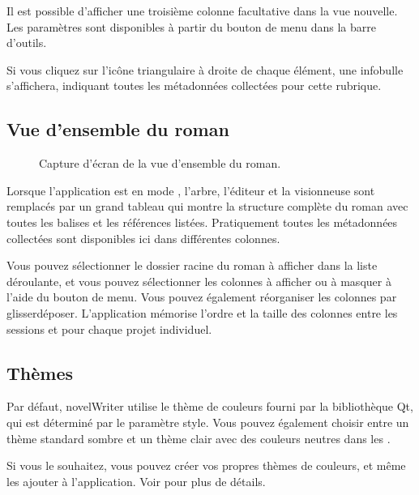\documentclass[a4paper,11pt,french]{sphinxmanual}
\begin{document}
\sphinxAtStartPar
Il est possible d’afficher une troisième colonne facultative dans la vue nouvelle. Les paramètres sont disponibles à partir du bouton de menu dans la barre d’outils.

\sphinxAtStartPar
Si vous cliquez sur l’icône triangulaire à droite de chaque élément, une infobulle s’affichera, indiquant toutes les métadonnées collectées pour cette rubrique.


\subsection{Vue d’ensemble du roman}
\label{\detokenize{usage_breakdown:novel-outline-view}}
\begin{figure}[htbp]
\centering
\capstart

\noindent{}
\caption{Capture d’écran de la vue d’ensemble du roman.}\label{\detokenize{usage_breakdown:id3}}\end{figure}

\sphinxAtStartPar
Lorsque l’application est en mode , l’arbre, l’éditeur et la visionneuse sont remplacés par un grand tableau qui montre la structure complète du roman avec toutes les balises et les références listées. Pratiquement toutes les métadonnées collectées sont disponibles ici dans différentes colonnes.

\sphinxAtStartPar
Vous pouvez sélectionner le dossier racine du roman à afficher dans la liste déroulante, et vous pouvez sélectionner les colonnes à afficher ou à masquer à l’aide du bouton de menu. Vous pouvez également réorganiser les colonnes par glisser\sphinxhyphen{}déposer. L’application mémorise l’ordre et la taille des colonnes entre les sessions et pour chaque projet individuel.


\subsection{Thèmes}
\label{\detokenize{usage_breakdown:colour-themes}}
\sphinxAtStartPar
Par défaut, novelWriter utilise le thème de couleurs fourni par la bibliothèque Qt, qui est déterminé par le paramètre  style. Vous pouvez également choisir entre un thème standard sombre et un thème clair avec des couleurs neutres dans les .

\sphinxAtStartPar
Si vous le souhaitez, vous pouvez créer vos propres thèmes de couleurs, et même les ajouter à l’application. Voir {\hyperref[\detokenize{more_customise:a-custom-theme}]{}} pour plus de détails.
\end{document}
